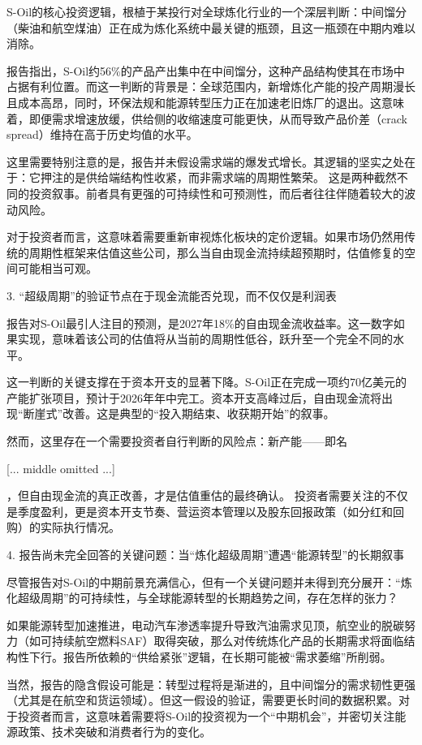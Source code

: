 \documentclass[11pt]{ctexart}
\begin{document}
S-Oil的核心投资逻辑，根植于某投行对全球炼化行业的一个深层判断：中间馏分（柴油和航空煤油）正在成为炼化系统中最关键的瓶颈，且这一瓶颈在中期内难以消除。

报告指出，S-Oil约56\%的产品产出集中在中间馏分，这种产品结构使其在市场中占据有利位置。而这一判断的背景是：全球范围内，新增炼化产能的投产周期漫长且成本高昂，同时，环保法规和能源转型压力正在加速老旧炼厂的退出。这意味着，即便需求增速放缓，供给侧的收缩速度可能更快，从而导致产品价差（crack spread）维持在高于历史均值的水平。

这里需要特别注意的是，报告并未假设需求端的爆发式增长。其逻辑的坚实之处在于：它押注的是供给端结构性收紧，而非需求端的周期性繁荣。 这是两种截然不同的投资叙事。前者具有更强的可持续性和可预测性，而后者往往伴随着较大的波动风险。

对于投资者而言，这意味着需要重新审视炼化板块的定价逻辑。如果市场仍然用传统的周期性框架来估值这些公司，那么当自由现金流持续超预期时，估值修复的空间可能相当可观。

3. “超级周期”的验证节点在于现金流能否兑现，而不仅仅是利润表

报告对S-Oil最引人注目的预测，是2027年18\%的自由现金流收益率。这一数字如果实现，意味着该公司的估值将从当前的周期性低谷，跃升至一个完全不同的水平。

这一判断的关键支撑在于资本开支的显著下降。S-Oil正在完成一项约70亿美元的产能扩张项目，预计于2026年年中完工。资本开支高峰过后，自由现金流将出现“断崖式”改善。这是典型的“投入期结束、收获期开始”的叙事。

然而，这里存在一个需要投资者自行判断的风险点：新产能——即名

[... middle omitted ...]

，但自由现金流的真正改善，才是估值重估的最终确认。 投资者需要关注的不仅是季度盈利，更是资本开支节奏、营运资本管理以及股东回报政策（如分红和回购）的实际执行情况。

4. 报告尚未完全回答的关键问题：当“炼化超级周期”遭遇“能源转型”的长期叙事

尽管报告对S-Oil的中期前景充满信心，但有一个关键问题并未得到充分展开：“炼化超级周期”的可持续性，与全球能源转型的长期趋势之间，存在怎样的张力？

如果能源转型加速推进，电动汽车渗透率提升导致汽油需求见顶，航空业的脱碳努力（如可持续航空燃料SAF）取得突破，那么对传统炼化产品的长期需求将面临结构性下行。报告所依赖的“供给紧张”逻辑，在长期可能被“需求萎缩”所削弱。

当然，报告的隐含假设可能是：转型过程将是渐进的，且中间馏分的需求韧性更强（尤其是在航空和货运领域）。但这一假设的验证，需要更长时间的数据积累。对于投资者而言，这意味着需要将S-Oil的投资视为一个“中期机会”，并密切关注能源政策、技术突破和消费者行为的变化。
\end{document}
